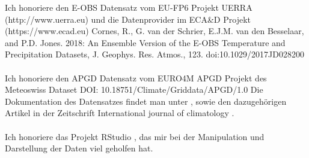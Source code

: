 
Ich honoriere den E-OBS Datensatz vom EU-FP6 Projekt UERRA (http://www.uerra.eu) und die Datenprovider im ECA\&D Projekt (https://www.ecad.eu) Cornes, R., G. van der Schrier, E.J.M. van den Besselaar, and P.D. Jones. 2018: An Ensemble Version of the E-OBS Temperature and Precipitation Datasets, J. Geophys. Res. Atmos., 123. doi:10.1029/2017JD028200
\cite[für weitere Informationen siehe][]{eobs}\\
\hfill\\
Ich honoriere den APGD Datensatz vom EURO4M APGD Projekt des Meteoswiss
Dataset DOI: 10.18751/Climate/Griddata/APGD/1.0 Die Dokumentation des Datensatzes findet man unter \cite{apgd}, sowie den dazugehörigen Artikel in der Zeitschrift International journal of climatology \cite[siehe][]{apgd_article}. \cite[für weitere Informationen siehe:][]{meteoswiss}\\
\hfill\\
Ich honoriere das Projekt RStudio \cite{RStudio}, das mir bei der Manipulation und Darstellung der Daten viel geholfen hat.
